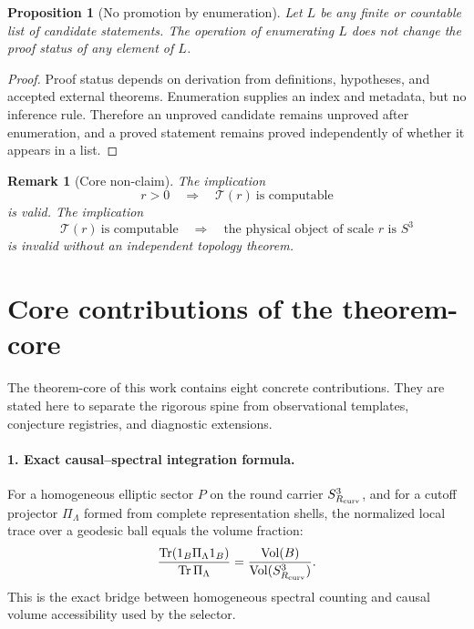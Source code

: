 \documentclass[11pt,a4paper]{article}
\newtheorem{proposition}[theorem]{Proposition}
\newtheorem{remark}[theorem]{Remark}
\begin{document}
\begin{proposition}[No promotion by enumeration]
Let $L$ be any finite or countable list of candidate statements.  The operation of enumerating $L$ does not change the proof status of any element of $L$.
\end{proposition}
\begin{proof}
Proof status depends on derivation from definitions, hypotheses, and accepted external theorems.  Enumeration supplies an index and metadata, but no inference rule.  Therefore an unproved candidate remains unproved after enumeration, and a proved statement remains proved independently of whether it appears in a list.
\end{proof}

\begin{remark}[Core non-claim]
The implication
\[
r>0\quad\Longrightarrow\quad \mathcal T(r)\ \text{is computable}
\]
is valid.  The implication
\[
\mathcal T(r)\ \text{is computable}\quad\Longrightarrow\quad
\text{the physical object of scale }r\text{ is }S^3
\]
is invalid without an independent topology theorem.
\end{remark}


\section{Core contributions of the theorem-core}
\label{sec:core-contributions}

The theorem-core of this work contains eight concrete contributions.  They are stated here to separate the rigorous spine from observational templates, conjecture registries, and diagnostic extensions.

\paragraph{1. Exact causal--spectral integration formula.}
For a homogeneous elliptic sector \(P\) on the round carrier \(S^3_{R_{\rm curv}}\), and for a cutoff projector \(\Pi_\Lambda\) formed from complete representation shells, the normalized local trace over a geodesic ball equals the volume fraction:
\[
\frac{\operatorname{Tr}(1_B\Pi_\Lambda 1_B)}
{\operatorname{Tr}\Pi_\Lambda}
=
\frac{\operatorname{Vol}(B)}
{\operatorname{Vol}(S^3_{R_{\rm curv}})}.
\]
This is the exact bridge between homogeneous spectral counting and causal volume accessibility used by the selector.
\end{document}
